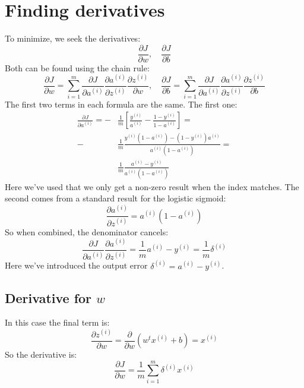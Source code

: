 \documentclass[12pt, a4paper]{article}
\numberwithin{equation}{section}
\begin{document}
\section{Finding derivatives}
To minimize, we seek the derivatives:
\begin{equation}
\frac{\partial J}{\partial w},\quad\frac{\partial J}{\partial b}
\end{equation}
Both can be found using the chain rule:
\begin{equation}
\frac{\partial J}{\partial w}=\sum_{i=1}^m\frac{\partial J}{\partial a^{(i)}}\frac{\partial a^{(i)}}{\partial z^{(i)}}\frac{\partial z^{(i)}}{\partial w},\quad
\frac{\partial J}{\partial b}=\sum_{i=1}^m\frac{\partial J}{\partial a^{(i)}}\frac{\partial a^{(i)}}{\partial z^{(i)}}\frac{\partial z^{(i)}}{\partial b}
\end{equation}
The first two terms in each formula are the same. The first one:
\begin{align}
\frac{\partial J}{\partial a^{(i)}}=-&\frac{1}{m}\left[\frac{y^{(i)}}{a^{(i)}}-\frac{1-y^{(i)}}{1-a^{(i)}}\right]=\\
-&\frac{1}{m}\frac{y^{(i)}(1-a^{(i)})-(1-y^{(i)})a^{(i)}}{a^{(i)}(1-a^{(i)})}=\\
&\frac{1}{m}\frac{a^{(i)}-y^{(i)}}{a^{(i)}(1-a^{(i)})}
\end{align}
Here we've used that we only get a non-zero result when the index matches. The second comes from a standard result for the logistic sigmoid:
\begin{equation}
\frac{\partial a^{(i)}}{\partial z^{(i)}}=a^{(i)}(1-a^{(i)})
\end{equation}
So when combined, the denominator cancels:
\begin{equation}
\frac{\partial J}{\partial a^{(i)}}\frac{\partial a^{(i)}}{\partial z^{(i)}}=\frac{1}{m}a^{(i)}-y^{(i)}=\frac{1}{m}\delta^{(i)}
\end{equation}
Here we've introduced the output error $\delta^{(i)}=a^{(i)}-y^{(i)}$.

\subsection{Derivative for $w$}
In this case the final term is:
\begin{equation}
\frac{\partial z^{(i)}}{\partial w}=\frac{\partial}{\partial w}\left(w^t x^{(i)}+b\right)=x^{(i)}
\end{equation}
So the derivative is:
\begin{equation}
\frac{\partial J}{\partial w}=\frac{1}{m}\sum_{i=1}^m\delta^{(i)}x^{(i)}
\end{equation}
\end{document}
